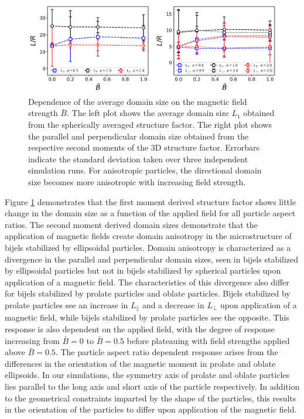 \begin{figure}
    \centering
    \includegraphics[scale = 0.4]{figures/results/paper1/D2a-vs-B_ss.png}
    \caption{Dependence of the average domain size on the magnetic field strength $\bar{B}$. The left plot shows the average domain size $L_1$ obtained from the spherically averaged structure factor. 
    The right plot shows the parallel and perpendicular domain size obtained from the respective second moments of the 3D structure factor. Errorbars indicate the standard deviation taken over 
    three independent simulation runs. For anisotropic particles, the directional domain size becomes more anisotropic with increasing field strength.}
    \label{fig:D2a_B}
\end{figure}

Figure \ref{fig:D2a_B} demonstrates that the first moment derived structure factor shows little change in the domain size as a function of the applied field for
all particle aspect ratios. The second moment derived domain sizes demonstrate that the application of magnetic fields create domain anisotropy in the microstructure
of bijels stabilized by ellipsoidal particles. Domain anisotropy is characterized as a divergence in the parallel and perpendicular domain sizes, seen in bijels
stabilized by ellipsoidal particles but not in bijels stabilized by spherical particles upon application of a magnetic field. The characteristics of this divergence
also differ for bijels stabilized by prolate particles and oblate particles. Bijels stabilized by prolate particles see an increase in $L_{\parallel}$ and a decrease in
$L_{\perp}$ upon application of a magnetic field, while bijels stabilized by prolate particles see the opposite. This response is also dependent on the applied field,
with the degree of response increasing from $\bar{B} = 0$ to $\bar{B} = 0.5$ before plateauing with field strengths applied above $\bar{B} = 0.5$.
The particle aspect ratio dependent response arises from the differences in the orientation of
the magnetic moment in prolate and oblate ellipsoids. In our simulations, the symmetry axis of prolate and oblate particles lies parallel to the long axis 
and short axis of the particle respectively. In addition to the geometrical constraints imparted by the shape of the particles, this results in the orientation of the
particles to differ upon application of the magnetic field.

